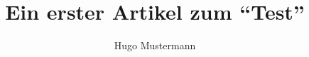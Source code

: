 \documentclass{dtk2}
\author{Hugo Mustermann}
\begin{document}
\title{Ein erster Artikel zum "`Test"'}

\maketitle

\blinddocument

\printbibliography
\end{document}
